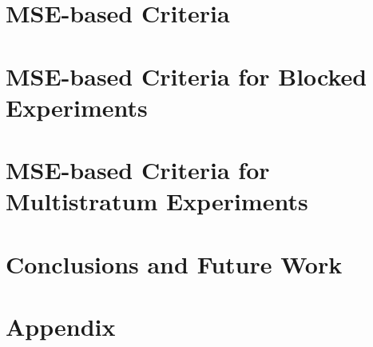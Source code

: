 \documentclass[titlepage,twoside,openright,final,11pt]{report}
\begin{document}
\chapter{MSE-based Criteria}
\label{ch::mse}


\chapter{MSE-based Criteria for Blocked Experiments}
\label{ch::mse_blocked}
  

\chapter{MSE-based Criteria for Multistratum Experiments}
\label{ch::mse_ms}


\chapter{Conclusions and Future Work}
\label{ch::conclusions}


\chapter*{Appendix}
\setcounter{section}{0}
\renewcommand{\thesection}{\Alph{section}}

\setcounter{figure}{0} 
\renewcommand{\thefigure}{A.\arabic{figure}}

\setcounter{equation}{0} 
\renewcommand{\theequation}{A.\arabic{equation}}

\setcounter{table}{0} 


\cleardoublepage
{}
{} 
%


\end{document}
